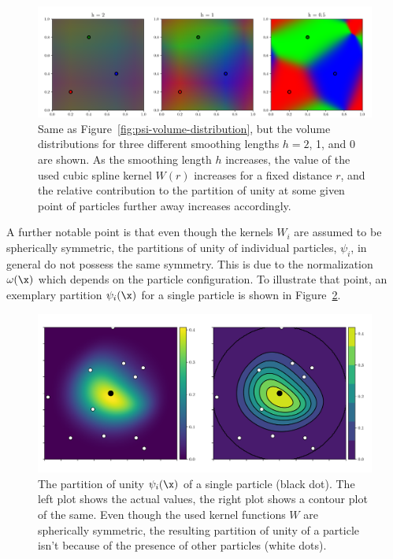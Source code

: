 \begin{figure}
 \centering
 \includegraphics[width=\textwidth]{figures/Meshless/volume_distribution_three_parts_vary_h.png}
 \caption{
Same as Figure~\ref{fig:psi-volume-distribution}, but the volume distributions for three different
smoothing lengths $h = 2$, 1, and 0 are shown. As the smoothing length $h$ increases, the value of
the used cubic spline kernel $W(r)$ increases for a fixed distance $r$, and the relative
contribution to the partition of unity at some given point of particles further away increases
accordingly.
}
\label{fig:psi-volume-distribution-vary-h}
\end{figure}


A further notable point is that even though the kernels $W_i$ are assumed to be spherically
symmetric, the partitions of unity of individual particles, $\psi_i$, in general do not possess the
same symmetry. This is due to the normalization $\omega(\x)$ which depends on the particle
configuration. To illustrate that point, an exemplary partition $\psi_i(\x)$ for a single particle
is shown in Figure~\ref{fig:psi-of-x-contour}.


\begin{figure}
 \centering
 \includegraphics[width=\textwidth]{figures/Meshless/psi_of_x_perturbed.png}
 \caption{ The partition of unity $\psi_i(\x)$ of a single particle (black dot). The left plot
shows the actual values, the right plot shows a contour plot of the same. Even though the used
kernel functions $W$ are spherically symmetric, the resulting partition of unity of a particle
isn't because of the presence of other particles (white dots).
}
\label{fig:psi-of-x-contour}
\end{figure}










